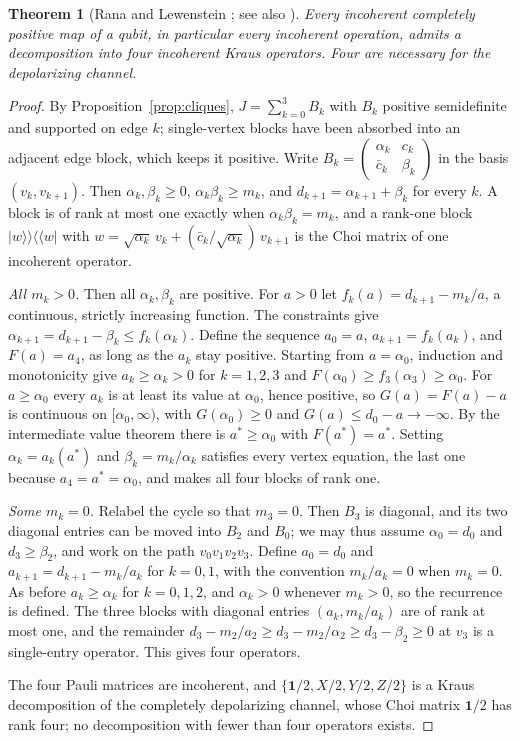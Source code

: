 \documentclass[11pt,a4paper]{article}
\newtheorem{theorem}{Theorem}
\theoremstyle{definition}
\theoremstyle{plain}
\newcommand{\kket}[1]{\lvert#1\rangle\!\rangle}
\newcommand{\bbra}[1]{\langle\!\langle#1\rvert}
\newcommand{\one}{\mathbf{1}}
\begin{document}
\begin{theorem}[Rana and Lewenstein \cite{RanaLewenstein2018}; see also \cite{Qiao2020}]\label{thm:qubit}
Every incoherent completely positive map of a qubit, in particular every
incoherent operation, admits a decomposition into four incoherent Kraus
operators. Four are necessary for the depolarizing channel.
\end{theorem}
\begin{proof}
By Proposition~\ref{prop:cliques}, $J=\sum_{k=0}^3B_k$ with $B_k$ positive
semidefinite and supported on edge $k$; single-vertex blocks have been
absorbed into an adjacent edge block, which keeps it positive. Write
$B_k=\begin{pmatrix}\alpha_k&c_k\\\bar c_k&\beta_k\end{pmatrix}$ in the basis
$(v_k,v_{k+1})$. Then $\alpha_k,\beta_k\ge0$, $\alpha_k\beta_k\ge m_k$, and
$d_{k+1}=\alpha_{k+1}+\beta_k$ for every $k$. A block is of rank at most one
exactly when $\alpha_k\beta_k=m_k$, and a rank-one block
$\kket w\bbra w$ with $w=\sqrt{\alpha_k}\,v_k+(\bar c_k/\sqrt{\alpha_k})\,v_{k+1}$
is the Choi matrix of one incoherent operator.

\emph{All $m_k>0$.} Then all $\alpha_k,\beta_k$ are positive. For $a>0$ let
$f_k(a)=d_{k+1}-m_k/a$, a continuous, strictly increasing function. The
constraints give $\alpha_{k+1}=d_{k+1}-\beta_k\le f_k(\alpha_k)$. Define the
sequence $a_0=a$, $a_{k+1}=f_k(a_k)$, and $F(a)=a_4$, as long as the
$a_k$ stay positive. Starting from $a=\alpha_0$, induction and monotonicity
give $a_k\ge\alpha_k>0$ for $k=1,2,3$ and $F(\alpha_0)\ge
f_3(\alpha_3)\ge\alpha_0$. For $a\ge\alpha_0$ every $a_k$ is at least its
value at $\alpha_0$, hence positive, so $G(a)=F(a)-a$ is continuous on
$[\alpha_0,\infty)$, with $G(\alpha_0)\ge0$ and $G(a)\le d_0-a\to-\infty$. By
the intermediate value theorem there is $a^*\ge\alpha_0$ with $F(a^*)=a^*$.
Setting $\alpha_k=a_k(a^*)$ and $\beta_k=m_k/\alpha_k$ satisfies every vertex
equation, the last one because $a_4=a^*=\alpha_0$, and makes all four blocks
of rank one.

\emph{Some $m_k=0$.} Relabel the cycle so that $m_3=0$. Then $B_3$ is
diagonal, and its two diagonal entries can be moved into $B_2$ and $B_0$; we
may thus assume $\alpha_0=d_0$ and $d_3\ge\beta_2$, and work on the path
$v_0v_1v_2v_3$. Define $a_0=d_0$ and $a_{k+1}=d_{k+1}-m_k/a_k$ for $k=0,1$,
with the convention $m_k/a_k=0$ when $m_k=0$. As before $a_k\ge\alpha_k$ for
$k=0,1,2$, and $\alpha_k>0$ whenever $m_k>0$, so the recurrence is defined.
The three blocks with diagonal entries $(a_k,m_k/a_k)$ are of rank at most
one, and the remainder $d_3-m_2/a_2\ge d_3-m_2/\alpha_2\ge d_3-\beta_2\ge0$
at $v_3$ is a single-entry operator. This gives four operators.

The four Pauli matrices are incoherent, and $\{\one/2,X/2,Y/2,Z/2\}$ is a
Kraus decomposition of the completely depolarizing channel, whose Choi matrix
$\one/2$ has rank four; no decomposition with fewer than four operators
exists.
\end{proof}
\end{document}
